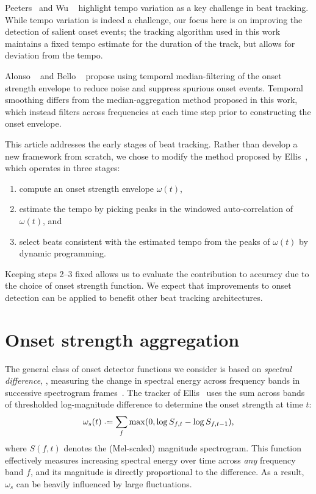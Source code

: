 \documentclass{article}
\begin{document}
Peeters~\cite{peeters2005time} and Wu \etal~\cite{wu2011two} highlight tempo variation as a 
key challenge in beat tracking. While tempo variation is indeed a challenge, our focus here 
is on improving the detection of salient onset events; the tracking algorithm used in
this work maintains a fixed tempo estimate for the duration of the track, but allows for
deviation from the tempo.

Alonso \etal~\cite{alonso2004tempo} and Bello \etal~\cite{bello2005tutorial} propose using 
temporal median-filtering of the onset strength envelope to reduce noise and suppress
spurious onset events.  Temporal smoothing differs from the median-aggregation method 
proposed in this work, which instead filters across frequencies at each time step prior to
constructing the onset envelope.

This article addresses the early stages of beat tracking.  Rather
than develop a new framework from scratch, we chose to modify the method
proposed by Ellis~\cite{ellis2007beat}, which operates in three stages:
\begin{enumerate}\addtolength{\itemsep}{-0.60\baselineskip}
\item compute an onset strength envelope $\omega(t)$,
\item estimate the tempo by picking peaks in the windowed auto-correlation of $\omega(t)$,
and
\item select beats consistent with the estimated tempo from the peaks of $\omega(t)$ by 
dynamic programming.
\end{enumerate}
Keeping steps 2--3 fixed allows us to evaluate the contribution to accuracy due to the
choice of onset strength function.
We expect that improvements to onset detection can be applied to benefit other beat
tracking architectures.

\section{Onset strength aggregation}
\label{sec:onsets}
The general class of onset detector functions we consider is based on \emph{spectral 
difference}, \ie, measuring the change in spectral energy across frequency bands in 
successive spectrogram frames~\cite{bello2005tutorial}. The tracker 
of Ellis~\cite{ellis2007beat} uses the sum across bands of thresholded log-magnitude
difference to determine the onset strength at time $t$:
\begin{equation}
\omega_s(t) \defeq \sum_f \max(0, \log S_{f, t} - \log S_{f, t-1}),\label{eq:onset:sum}
\end{equation}
where $S(f,t)$ denotes the (Mel-scaled) magnitude spectrogram.  This function effectively 
measures increasing spectral energy over time across \emph{any} frequency band $f$, and 
its magnitude is directly proportional to the difference.  As a result, $\omega_s$ can be
heavily influenced by large fluctuations.
\end{document}
